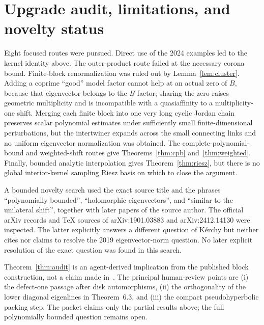 \documentclass[11pt]{article}
\begin{document}
\section{Upgrade audit, limitations, and novelty status}

Eight focused routes were pursued.  Direct use of the 2024 examples led to
the kernel identity above.  The outer-product route failed at the necessary
corona bound.  Finite-block renormalization was ruled out by
Lemma~\ref{lem:cluster}.  Adding a coprime ``good'' model factor cannot help
at an actual zero of $B$, because that eigenvector belongs to the $B$ factor;
sharing the zero raises geometric multiplicity and is incompatible with a
quasiaffinity to a multiplicity-one shift.  Merging each finite block into
one very long cyclic Jordan chain preserves scalar polynomial estimates
under sufficiently small finite-dimensional perturbations, but the
intertwiner expands across the small connecting links and no uniform
eigenvector normalization was obtained.  The complete-polynomial-bound and
weighted-shift routes give Theorems~\ref{thm:cpb} and~\ref{thm:weighted}.
Finally, bounded analytic interpolation gives Theorem~\ref{thm:riesz}, but
there is no global interior-kernel sampling Riesz basis on which to close
the argument.

A bounded novelty search used the exact source title and the phrases
``polynomially bounded'', ``holomorphic eigenvectors'', and ``similar to the
unilateral shift'', together with later papers of the source author.  The
official arXiv records and TeX sources of arXiv:1901.03883 and
arXiv:2412.14130 were inspected.  The latter explicitly answers a different
question of K\'erchy but neither cites nor claims to resolve the 2019
eigenvector-norm question.  No later explicit resolution of the exact
question was found in this search.

Theorem~\ref{thm:audit} is an agent-derived implication from the published
block construction, not a claim made in~\cite{Gamal2024}.  The principal
human-review points are (i) the defect-one passage after disk automorphisms,
(ii) the orthogonality of the lower diagonal eigenlines in Theorem~6.3, and
(iii) the compact pseudohyperbolic packing step.  The packet claims only the
partial results above; the full polynomially bounded question remains open.
\end{document}
